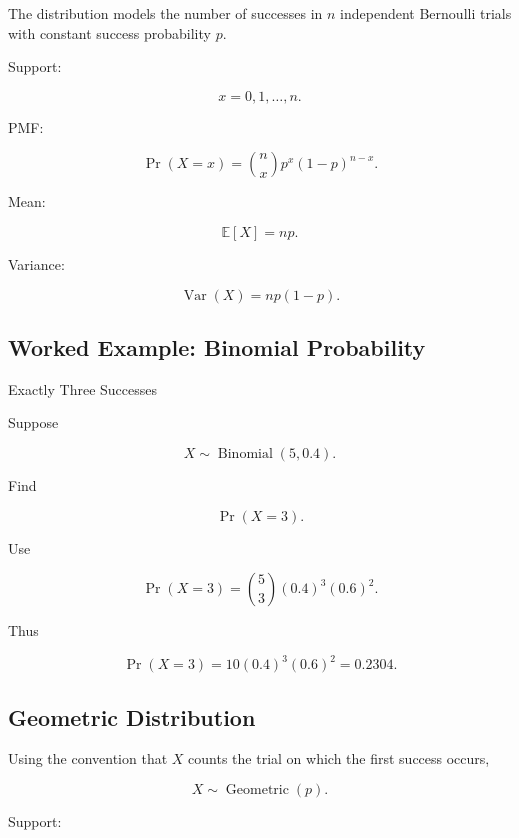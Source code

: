 The distribution models the number of successes in \(n\) independent
Bernoulli trials with constant success probability \(p\).

Support:

\[
\boxed{
x=0,1,\ldots,n.
}
\]

PMF:

\[
\boxed{
\Pr(X=x)
=
\binom{n}{x}
p^x(1-p)^{n-x}.
}
\]

Mean:

\[
\boxed{
\mathbb{E}[X]
=
np.
}
\]

Variance:

\[
\boxed{
\operatorname{Var}(X)
=
np(1-p).
}
\]

\subsection{Worked Example: Binomial Probability}
\label{subsec:worked-binomial-probability}

\begin{workedexamplebox}{Exactly Three Successes}

Suppose

\[
X\sim\operatorname{Binomial}(5,0.4).
\]

Find

\[
\Pr(X=3).
\]

Use

\[
\Pr(X=3)
=
\binom53
(0.4)^3
(0.6)^2.
\]

Thus

\begin{answerbox}
\[
\boxed{
\Pr(X=3)
=
10(0.4)^3(0.6)^2
=
0.2304.
}
\]
\end{answerbox}

\end{workedexamplebox}

\subsection{Geometric Distribution}
\label{subsec:geometric-distribution-reference}

Using the convention that \(X\) counts the trial on which the first success
occurs,

\[
\boxed{
X\sim\operatorname{Geometric}(p).
}
\]

Support:

